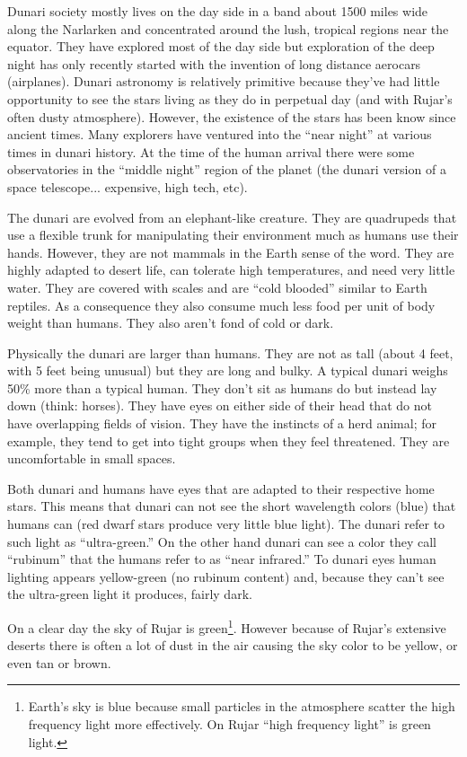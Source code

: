 Dunari society mostly lives on the day side in a band about 1500 miles wide along the Narlarken
and concentrated around the lush, tropical regions near the equator. They have explored most of
the day side but exploration of the deep night has only recently started with the invention of
long distance aerocars (airplanes). Dunari astronomy is relatively primitive because they've had
little opportunity to see the stars living as they do in perpetual day (and with Rujar's often
dusty atmosphere). However, the existence of the stars has been know since ancient times. Many
explorers have ventured into the ``near night'' at various times in dunari history. At the time
of the human arrival there were some observatories in the ``middle night'' region of the planet
(the dunari version of a space telescope... expensive, high tech, etc).

The dunari are evolved from an elephant-like creature. They are quadrupeds that use a flexible
trunk for manipulating their environment much as humans use their hands. However, they are not
mammals in the Earth sense of the word. They are highly adapted to desert life, can tolerate
high temperatures, and need very little water. They are covered with scales and are ``cold
blooded'' similar to Earth reptiles. As a consequence they also consume much less food per unit
of body weight than humans. They also aren't fond of cold or dark.

Physically the dunari are larger than humans. They are not as tall (about 4 feet, with 5 feet
being unusual) but they are long and bulky. A typical dunari weighs 50\% more than a typical
human. They don't sit as humans do but instead lay down (think: horses). They have eyes on
either side of their head that do not have overlapping fields of vision. They have the instincts
of a herd animal; for example, they tend to get into tight groups when they feel threatened.
They are uncomfortable in small spaces.

Both dunari and humans have eyes that are adapted to their respective home stars. This means
that dunari can not see the short wavelength colors (blue) that humans can (red dwarf stars
produce very little blue light). The dunari refer to such light as ``ultra-green.'' On the other
hand dunari can see a color they call ``rubinum'' that the humans refer to as ``near infrared.''
To dunari eyes human lighting appears yellow-green (no rubinum content) and, because they can't
see the ultra-green light it produces, fairly dark.

On a clear day the sky of Rujar is green\footnote{Earth's sky is blue because small particles
  in the atmosphere scatter the high frequency light more effectively. On Rujar ``high
  frequency light'' is green light.}. However because of Rujar's extensive deserts there is
often a lot of dust in the air causing the sky color to be yellow, or even tan or brown.

